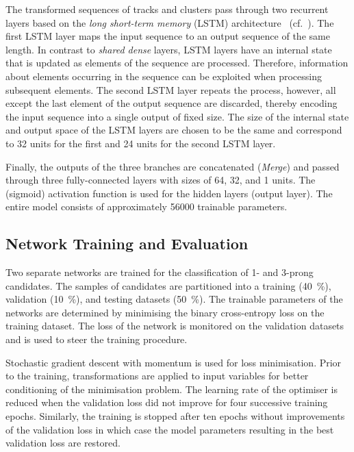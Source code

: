The transformed sequences of tracks and clusters pass through two
recurrent layers based on the \emph{long short-term memory} (LSTM)
architecture~\cite{lstm} (cf.\ ). The first LSTM layer
maps the input sequence to an output sequence of the same length. In
contrast to \emph{shared dense} layers, LSTM layers have an internal
state that is updated as elements of the sequence are
processed. Therefore, information about elements occurring in the
sequence can be exploited when processing subsequent elements. The
second LSTM layer repeats the process, however, all except the last
element of the output sequence are discarded, thereby encoding the
input sequence into a single output of fixed size. The size of the
internal state and output space of the LSTM layers are chosen to be
the same and correspond to 32 units for the first and 24 units for the
second LSTM layer.

Finally, the outputs of the three branches are concatenated
(\emph{Merge}) and passed through three fully-connected layers with
sizes of 64, 32, and 1 units. The \ReLU (sigmoid) activation function
is used for the hidden layers (output layer). The entire model
consists of approximately \num{56000} trainable parameters.


\subsection{Network Training and Evaluation}

Two separate networks are trained for the classification of 1- and
3-prong \tauhadvis candidates. The samples of \tauhadvis candidates
are partitioned into a training (\SI{40}{\percent}), validation
(\SI{10}{\percent}), and testing datasets (\SI{50}{\percent}). The
trainable parameters of the networks are determined by minimising the
binary cross-entropy loss on the training dataset. The loss of the
network is monitored on the validation datasets and is used to steer
the training procedure.

Stochastic gradient descent with momentum is used for loss
minimisation. Prior to the training, transformations are applied to
input variables for better conditioning of the minimisation
problem. The learning rate of the optimiser is reduced when the
validation loss did not improve for four successive training
epochs. Similarly, the training is stopped after ten epochs without
improvements of the validation loss in which case the model parameters
resulting in the best validation loss are restored.


